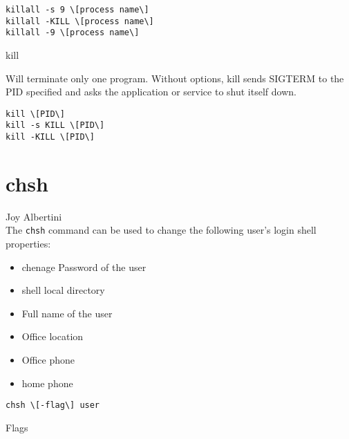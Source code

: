 \documentclass[hidelinks,12pt,a4paper,numbers=enddot]{scrartcl}
\begin{document}
\begin{verbatim}
killall -s 9 \[process name\]
killall -KILL \[process name\]
killall -9 \[process name\]
\end{verbatim}

kill

Will terminate only one program.
Without options, kill sends SIGTERM to the PID specified and asks the application
or service to shut itself down.

\begin{verbatim}
kill \[PID\]
kill -s KILL \[PID\]
kill -KILL \[PID\]
\end{verbatim}

\section{chsh}


\large Joy Albertini \normalsize\\



The \texttt{chsh} command can be used to change the following user's login shell properties:

\begin{itemize}
    \item chenage Password of the user
    \item  shell local directory
    \item Full name of the user
    \item Office location
    \item Office phone
    \item home phone 
\end{itemize}

\begin{verbatim}
chsh \[-flag\] user
\end{verbatim}

Flags
\end{document}
